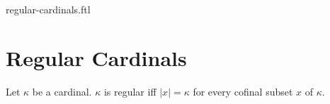 \documentclass{naproche-library}
\begin{document}
\begin{smodule}{regular-cardinals.ftl}

  \section*{Regular Cardinals}

  \begin{definition}[forthel,id=SET_THEORY_06_6532641205487950,printid]
    Let $\kappa$ be a cardinal.
    $\kappa$ is regular iff $|x| = \kappa$ for every cofinal subset $x$ of $\kappa$.
  \end{definition}
\end{smodule}
\end{document}
